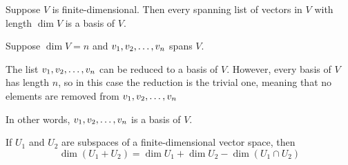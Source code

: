 \begin{theorem} 
   Suppose $V$ is finite-dimensional. Then every spanning list of
   vectors in $V$ with length $\dim{V}$ is a basis of $V$.
   
   \begin{proof*}
       Suppose $\dim{V} = n$ and $v_1, v_2, \ldots, v_n$ spans $V$.

       The list $v_1, v_2, \ldots, v_n$ can be reduced to a basis of $V$. However,
       every basis of $V$ has length $n$, so in this case the reduction
       is the trivial one, meaning that no elements are removed from
       $v_1, v_2, \ldots, v_n$

       In other words, $v_1, v_2, \ldots, v_n$ is a basis of $V$.
   \end{proof*}
\end{theorem}

\begin{theorem} 
    If $U_1$ and $U_2$ are subspaces of a finite-dimensional vector space,
    then
    \[ \dim(U_1+ U_2) = \dim{U_1} + \dim{U_2} - \dim(U_1 \cap U_2)\]
\end{theorem}

\endinput